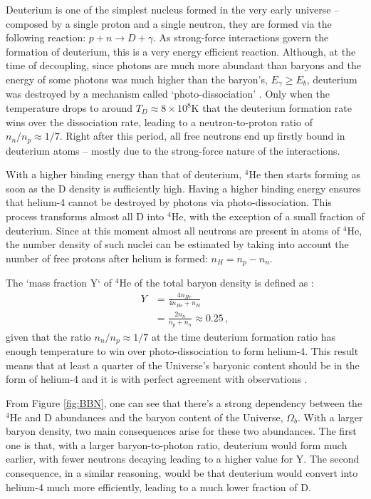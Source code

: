 Deuterium is one of the simplest nucleus formed in the very early universe -- composed by a single proton and a single neutron, they are formed via the following reaction: $p + n \rightarrow D + \gamma$. As strong-force interactions govern the formation of deuterium, this is a very energy efficient reaction. Although, at the time of decoupling, since photons are much more abundant than baryons and the energy of some photons was much higher than the baryon's, $E_{\gamma} \geq E_{b}$, deuterium was destroyed by a mechanism called `photo-dissociation' \citep{2000Deuterium-Tyler}. Only when the temperature drops to around $T_D \approx 8\times 10^8$K that the deuterium formation rate wins over the dissociation rate, leading to a neutron-to-proton ratio of $n_n/n_p \approx 1/7$. Right after this period, all free neutrons end up firstly bound in deuterium atoms -- mostly due to the strong-force nature of the interactions.

\qquad With a higher binding energy than that of deuterium, $^4$He then starts forming as soon as the D density is sufficiently high. Having a higher binding energy ensures that helium-4 cannot be destroyed by photons via photo-dissociation. This process transforms almost all D into $^4$He, with the exception of a small fraction of deuterium. Since at this moment almost all neutrons are present in atoms of $^4$He, the number density of such nuclei can be estimated by taking into account the number of free protons after helium is formed: $n_{H} = n_p - n_n$. 

\qquad The `mass fraction Y` of $^4$He of the total baryon density is defined as \citep{2000-BBN-Review,2016R-BBN-Review}:
\begin{align}
    Y & = \frac{4n_{He}}{4n_{He}+n_H} \\
      & = \frac{2n_n}{n_p + n_n} \approx 0.25\, ,
\end{align}
given that the ratio $n_n/n_p \approx 1/7$ at the time deuterium formation ratio has enough temperature to win over photo-dissociation to form helium-4. This result means that at least a quarter of the Universe's baryonic content should be in the form of helium-4 and it is with perfect agreement with observations \citep{2015-Abundances-Data,2017-Abundances-Fig}.

\qquad From Figure \ref{fig:BBN}, one can see that there's a strong dependency between the $^4$He and D abundances and the baryon content of the Universe, $\Omega_b$. With a larger baryon density, two main consequences arise for these two abundances. The first one is that, with a larger baryon-to-photon ratio, deuterium would form much earlier, with fewer neutrons decaying leading to a higher value for Y. The second consequence, in a similar reasoning, would be that deuterium would convert into helium-4 much more efficiently, leading to a much lower fraction of D.

